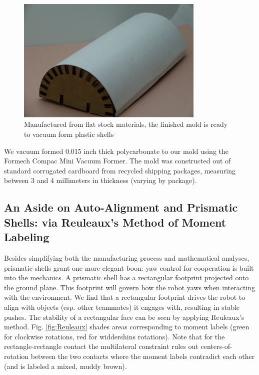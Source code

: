 \documentclass[letterpaper]{report}
\begin{document}
\begin{figure}
\centering
\includegraphics[width=0.8\textwidth]{FinishedMold.jpg}
\caption{\label{fig:Finished Mold}Manufactured from flat stock materials, the finished mold is ready to vacuum form plastic shells}
\end{figure}

We vacuum formed 0.015 inch thick polycarbonate to our mold using the Formech Compac Mini Vacuum Former.
The mold was constructed out of standard corrugated cardboard from recycled shipping packages, measuring between 3 and 4 millimeters in thickness (varying by package).

\subsection{An Aside on Auto-Alignment and Prismatic Shells: via Reuleaux's Method of Moment Labeling \label{sec:Reuleaux}}
Besides simplifying both the manufacturing process and mathematical analyses, prismatic shells grant one more elegant boon: yaw control for cooperation is built into the mechanics.
A prismatic shell has a rectangular footprint projected onto the ground plane.
This footprint will govern how the robot yaws when interacting with the environment.
We find that a rectangular footprint drives the robot to align with objects (esp. other teammates) it engages with, resulting in stable pushes.
The stability of a rectangular face can be seen by applying Reuleaux's method.
Fig. \ref{fig:Reuleaux} shades areas corresponding to moment labels (green for clockwise rotations, red for widdershins rotations).
Note that for the rectangle-rectangle contact the multilateral constraint rules out centers-of-rotation between the two contacts where the moment labels contradict each other (and is labeled a mixed, muddy brown).
\end{document}
